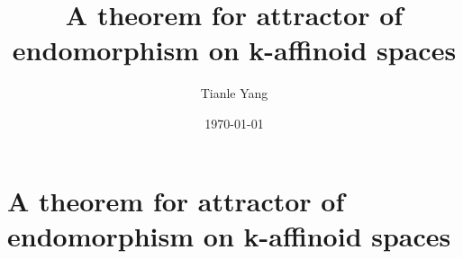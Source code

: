 \documentclass[sectionlevel=section,status=draft]{noteformyself}
\title{A theorem for attractor of endomorphism on k-affinoid spaces}
\author{Tianle Yang}
\date{\today}
\begin{document}
    \maketitle

    \section[
      status=draft,
      tag=00000,
      label=\labelNFM{sec:dynamics-on-berkovich-spaces:a-theorem-for-attractor-of-endomorphism-on-k-affinoid-spaces}
    ]{A theorem for attractor of endomorphism on k-affinoid spaces}



    \printbibliography[heading=bibintoc, title={References}] %
\end{document}
